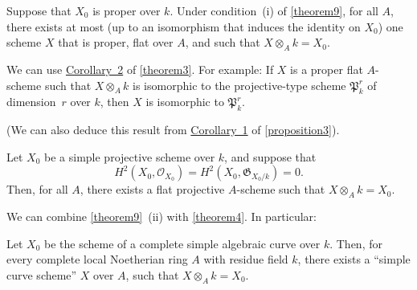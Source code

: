 \documentclass{article}
\theoremstyle{plain}
\newenvironment{corollary}[1]
  {\renewcommand\theinnercustomcorollary{#1}\innercustomcorollary}
  {\endinnercustomcorollary}
\theoremstyle{definition}
\newcommand{\sh}[1]{{\mathscr{#1}}}
\newcommand{\fk}{\mathfrak}
\begin{document}
\begin{corollary}{1}
\label{theorem9corollary1}
  Suppose that $X_0$ is proper over $k$.
  Under condition~(i) of \cref{theorem9}, for all $A$, there exists at most (up to an isomorphism that induces the identity on $X_0$) one scheme $X$ that is proper, flat over $A$, and such that $X\otimes_Ak=X_0$.
\end{corollary}

We can use \hyperref[theorem3corollary2]{Corollary~2} of \cref{theorem3}.
For example:
\begin{corollary}{2}
\label{theorem9corollary2}
  If $X$ is a proper flat $A$-scheme such that $X\otimes_Ak$ is isomorphic to the projective-type scheme $\fk{P}_k^r$ of dimension~$r$ over $k$, then $X$ is isomorphic to $\fk{P}_k^r$.
\end{corollary}

(We can also deduce this result from \hyperref[proposition3corollary1]{Corollary~1} of \cref{proposition3}).

\begin{corollary}{3}
\label{theorem9corollary3}
  Let $X_0$ be a simple projective scheme over $k$, and suppose that
  \[
    H^2(X_0,\sh{O}_{X_0}) = H^2(X_0,\fk{G}_{X_0/k}) = 0.
  \]
  Then, for all $A$, there exists a flat projective $A$-scheme such that $X\otimes_Ak=X_0$.
\end{corollary}

We can combine \cref{theorem9}~(ii) with \cref{theorem4}.
In particular:

\begin{corollary}{4}
\label{theorem9corollary4}
  Let $X_0$ be the scheme of a complete simple algebraic curve over $k$.
  Then, for every complete local Noetherian ring $A$ with residue field $k$, there exists a ``simple curve scheme'' $X$ over $A$, such that $X\otimes_Ak=X_0$.
\end{corollary}
\end{document}
